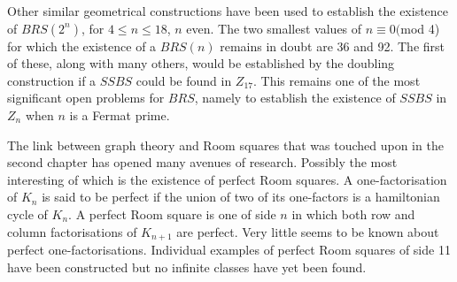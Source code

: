 \documentclass[
  11pt,
  a4paper]{book}
\newcounter{example}
\begin{document}
Other similar geometrical constructions have been used to establish the
existence of \(BRS(2^n)\), for \(4 \leq n \leq 18\), \(n\) even. The two
smallest values of \(n \equiv 0(\)mod 4) for which the existence of a
\(BRS(n)\) remains in doubt are 36 and 92. The first of these, along
with many others, would be established by the doubling construction if a
\(SSBS\) could be found in \(Z_{17}\). This remains one of the most
significant open problems for \(BRS\), namely to establish the existence
of \(SSBS\) in \(Z_n\) when \(n\) is a Fermat prime.

The link between graph theory and Room squares that was touched upon in
the second chapter has opened many avenues of research. Possibly the
most interesting of which is the existence of perfect Room squares. A
one-factorisation of \(K_n\) is said to be perfect if the union of two
of its one-factors is a hamiltonian cycle of \(K_n\). A perfect Room
square is one of side \(n\) in which both row and column factorisations
of \(K_{n + 1}\) are perfect. Very little seems to be known about
perfect one-factorisations. Individual examples of perfect Room squares
of side 11 have been constructed but no infinite classes have yet been
found.

\backmatter
\printbibliography[title=References]
\end{document}
